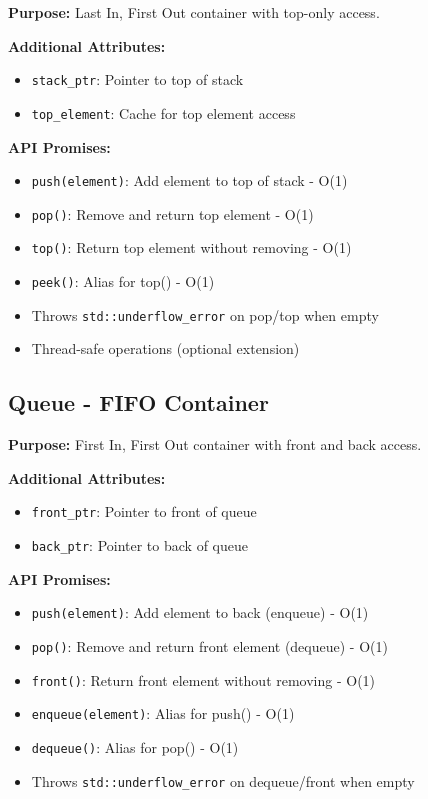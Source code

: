 \documentclass[12pt,a4paper]{article}
\begin{document}
\textbf{Purpose:} Last In, First Out container with top-only access.

\textbf{Additional Attributes:}
\begin{itemize}
    \item \texttt{stack\_ptr}: Pointer to top of stack
    \item \texttt{top\_element}: Cache for top element access
\end{itemize}

\textbf{API Promises:}
\begin{itemize}
    \item \texttt{push(element)}: Add element to top of stack - O(1)
    \item \texttt{pop()}: Remove and return top element - O(1)
    \item \texttt{top()}: Return top element without removing - O(1)
    \item \texttt{peek()}: Alias for top() - O(1)
    \item Throws \texttt{std::underflow\_error} on pop/top when empty
    \item Thread-safe operations (optional extension)
\end{itemize}

\subsection{Queue - FIFO Container}

\textbf{Purpose:} First In, First Out container with front and back access.

\textbf{Additional Attributes:}
\begin{itemize}
    \item \texttt{front\_ptr}: Pointer to front of queue
    \item \texttt{back\_ptr}: Pointer to back of queue
\end{itemize}

\textbf{API Promises:}
\begin{itemize}
    \item \texttt{push(element)}: Add element to back (enqueue) - O(1)
    \item \texttt{pop()}: Remove and return front element (dequeue) - O(1)
    \item \texttt{front()}: Return front element without removing - O(1)
    \item \texttt{enqueue(element)}: Alias for push() - O(1)
    \item \texttt{dequeue()}: Alias for pop() - O(1)
    \item Throws \texttt{std::underflow\_error} on dequeue/front when empty
\end{itemize}
\end{document}
